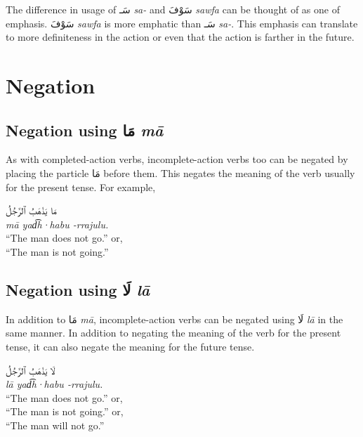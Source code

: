 \documentclass[
  10pt,
]{book}
\begin{document}
The difference in usage of \foreignlanguage{arabic}{سَـ} \emph{sa-} and \foreignlanguage{arabic}{سَوْفَ} \emph{sawfa} can be thought of as one of emphasis. \foreignlanguage{arabic}{سَوْفَ} \emph{sawfa} is more emphatic than \foreignlanguage{arabic}{سَـ} \emph{sa-}. This emphasis can translate to more definiteness in the action or even that the action is farther in the future.

\section{Negation}\label{negation}

\subsection{\texorpdfstring{Negation using \foreignlanguage{arabic}{مَا} \emph{mā}}{Negation using مَا mā}}\label{negation-using-ux645ux627-ma}

As with completed-action verbs, incomplete-action verbs too can be negated by placing the particle \foreignlanguage{arabic}{مَا} before them. This negates the meaning of the verb usually for the present tense. For example,

\foreignlanguage{arabic}{مَا يَذْهَبُ ٱلرَّجُلُ}\\
\emph{mā yad͡h·habu -rrajulu.}\\
\enquote{The man does not go.} or,\\
\enquote{The man is not going.}

\subsection{\texorpdfstring{Negation using \foreignlanguage{arabic}{لَا} \emph{lā}}{Negation using لَا lā}}\label{u-state-verb-negation-la}

In addition to \foreignlanguage{arabic}{مَا} \emph{mā}, incomplete-action verbs can be negated using \foreignlanguage{arabic}{لَا} \emph{lā} in the same manner. In addition to negating the meaning of the verb for the present tense, it can also negate the meaning for the future tense.

\foreignlanguage{arabic}{لَا يَذْهَبُ ٱلرَّجُلُ}\\
\emph{lā yad͡h·habu -rrajulu.}\\
\enquote{The man does not go.} or,\\
\enquote{The man is not going.} or,\\
\enquote{The man will not go.}
\end{document}
